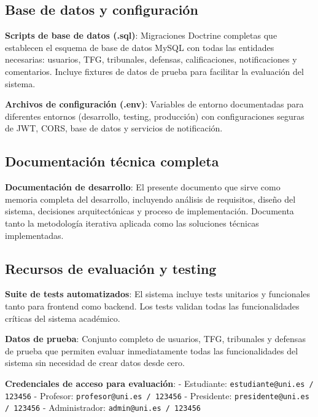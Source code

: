 \documentclass[12pt,a4paper,oneside]{report}
\begin{document}
\subsection{Base de datos y configuración}\label{base-de-datos-y-configuracion}

\textbf{Scripts de base de datos (.sql)}: Migraciones Doctrine completas que establecen el esquema de base de datos MySQL con todas las entidades necesarias: usuarios, TFG, tribunales, defensas, calificaciones, notificaciones y comentarios. Incluye fixtures de datos de prueba para facilitar la evaluación del sistema.

\textbf{Archivos de configuración (.env)}: Variables de entorno documentadas para diferentes entornos (desarrollo, testing, producción) con configuraciones seguras de JWT, CORS, base de datos y servicios de notificación.

\subsection{Documentación técnica completa}\label{documentacion-tecnica-completa}

\textbf{Documentación de desarrollo}: El presente documento que sirve como memoria completa del desarrollo, incluyendo análisis de requisitos, diseño del sistema, decisiones arquitectónicas y proceso de implementación. Documenta tanto la metodología iterativa aplicada como las soluciones técnicas implementadas.

\subsection{Recursos de evaluación y testing}\label{recursos-de-evaluacion-y-testing}

\textbf{Suite de tests automatizados}: El sistema incluye tests unitarios y funcionales tanto para frontend como backend. Los tests validan todas las funcionalidades críticas del sistema académico.

\textbf{Datos de prueba}: Conjunto completo de usuarios, TFG, tribunales y defensas de prueba que permiten evaluar inmediatamente todas las funcionalidades del sistema sin necesidad de crear datos desde cero.

\textbf{Credenciales de acceso para evaluación}:
- Estudiante: \texttt{estudiante@uni.es / 123456}
- Profesor: \texttt{profesor@uni.es / 123456}
- Presidente: \texttt{presidente@uni.es / 123456}
- Administrador: \texttt{admin@uni.es / 123456}
\end{document}

